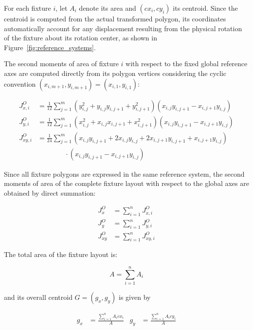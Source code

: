 For each fixture $i$, let $A_i$ denote its area and $(cx_i,cy_i)$ its centroid. Since the centroid is computed from the actual transformed polygon, its coordinates automatically account for any displacement resulting from the physical rotation of the fixture about its rotation center, as shown in Figure~\ref{fig:reference_systems}.

The second moments of area of fixture $i$ with respect to the fixed global
reference axes are computed directly from its polygon vertices considering the cyclic convention $(x_{i,m+1},y_{i,m+1})=(x_{i,1},y_{i,1})$:

\begin{align*}
	J^{O}_{x,i}
	&=
	\frac{1}{12}
	\sum_{j=1}^{m}
	\left(
	y_{i,j}^{2}
	+y_{i,j}y_{i,j+1}
	+y_{i,j+1}^{2}
	\right)
	\left(
	x_{i,j}y_{i,j+1}
	-x_{i,j+1}y_{i,j}
	\right)
	\\
	J^{O}_{y,i}
	&=
	\frac{1}{12}
	\sum_{j=1}^{m}
	\left(
	x_{i,j}^{2}
	+x_{i,j}x_{i,j+1}
	+x_{i,j+1}^{2}
	\right)
	\left(
	x_{i,j}y_{i,j+1}
	-x_{i,j+1}y_{i,j}
	\right)
	\\
	J^{O}_{xy,i}
	&=
	\frac{1}{24}
	\sum_{j=1}^{m}
	\left(
	x_{i,j}y_{i,j+1}
	+2x_{i,j}y_{i,j}
	+2x_{i,j+1}y_{i,j+1}
	+x_{i,j+1}y_{i,j}
	\right)
	\nonumber\\
	&\qquad\qquad\cdot
	\left(
	x_{i,j}y_{i,j+1}
	-x_{i,j+1}y_{i,j}
	\right)
\end{align*}

Since all fixture polygons are expressed in the same reference system, the
second moments of area of the complete fixture layout with respect to the
global axes are obtained by direct summation:

\begin{align*}
	J_x^{O} &= \sum_{i=1}^{n} J^{O}_{x,i}
	\\
	J_y^{O} &= \sum_{i=1}^{n} J^{O}_{y,i}
	\\
	J_{xy}^{O} &= \sum_{i=1}^{n} J^{O}_{xy,i}
\end{align*}

The total area of the fixture layout is:

\begin{equation*}
	A = \sum_{i=1}^{n} A_i
\end{equation*}

and its overall centroid $G=(g_x,g_y)$ is given by

\begin{align*}
	g_x &=
	\frac{\displaystyle\sum_{i=1}^{n}A_i cx_i}{A}
	&
	g_y &=
	\frac{\displaystyle\sum_{i=1}^{n}A_i cy_i}{A}
\end{align*}

